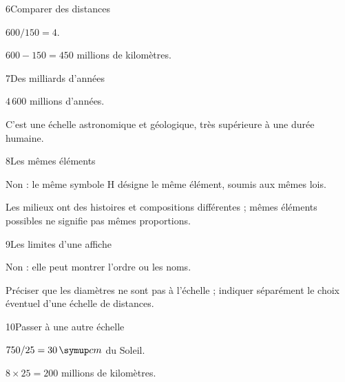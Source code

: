\par\noindent\begin{minipage}{\linewidth}
\begin{corrige}{6}{Comparer des distances}
\begin{questions}
\item $600/150=4$.
\item $600-150=450$ millions de kilomètres.
\end{questions}
\end{corrige}
\end{minipage}
\par\noindent\begin{minipage}{\linewidth}
\begin{corrige}{7}{Des milliards d’années}
\begin{questions}
\item $4\,600$ millions d’années.
\item C’est une échelle astronomique et géologique, très supérieure à une durée humaine.
\end{questions}
\end{corrige}
\end{minipage}
\par\noindent\begin{minipage}{\linewidth}
\begin{corrige}{8}{Les mêmes éléments}
\begin{questions}
\item Non : le même symbole H désigne le même élément, soumis aux mêmes lois.
\item Les milieux ont des histoires et compositions différentes ; mêmes éléments possibles ne signifie pas mêmes proportions.
\end{questions}
\end{corrige}
\end{minipage}
\par\noindent\begin{minipage}{\linewidth}
\begin{corrige}{9}{Les limites d’une affiche}
\begin{questions}
\item Non : elle peut montrer l’ordre ou les noms.
\item Préciser que les diamètres ne sont pas à l’échelle ; indiquer séparément le choix éventuel d’une échelle de distances.
\end{questions}
\end{corrige}
\end{minipage}
\par\noindent\begin{minipage}{\linewidth}
\begin{corrige}{10}{Passer à une autre échelle}
\begin{questions}
\item $750/25=30\unite{cm}$ du Soleil.
\item $8\times25=200$ millions de kilomètres.
\end{questions}
\end{corrige}
\end{minipage}
